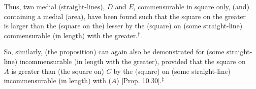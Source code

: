 \begin{Parallel}{}{}
{Thus, two medial (straight-lines), $D$ and $E$, commensurable in square only, (and) containing a medial (area), have been found such that
the square on the greater is larger than the (square on the) lesser by the
(square) on (some straight-line) commensurable (in length) with the greater.$^\dag$.

So, similarly, (the proposition) can again also be demonstrated for
(some straight-line) incommensurable (in length with the greater), provided that
the square on $A$ is greater than (the square on) $C$ by the (square)
on (some straight-line) incommensurable (in length) with ($A$) [Prop. 10.30].$^\ddag$}
\end{Parallel}



